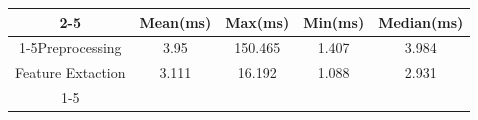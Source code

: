 \documentclass{standalone}
\begin{document}
 
 \begin{tabular}{|c |c |c |c |c |}
\cline{2-5}\cline{2-5} \multicolumn{1}{c |}{ } & Mean(ms) & Max(ms) & Min(ms) & Median(ms)\\ 
\cline{1-5}Preprocessing & 3.95 & 150.465 & 1.407 & 3.984\\ 
 \hhline{|=|=|=|=|=|}Feature Extaction & 3.111 & 16.192 & 1.088 & 2.931\\ 
 \cline{1-5}\hline \end{tabular}
 
\end{document}
